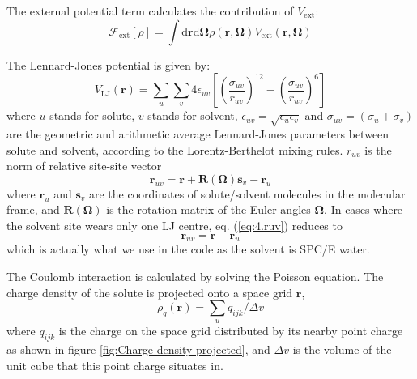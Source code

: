 The external potential term calculates the contribution of $V_{\mathrm{ext}}$:
\begin{equation}
\mathcal{F}_{\mathrm{ext}}[\rho]=\int\mathrm{d}\mathbf{r}\mathrm{d}\mathbf{\mathbf{\Omega}}\rho(\mathbf{r},\mathbf{\mathbf{\mathbf{\mathbf{\Omega}}}})V_{\mathrm{ext}}(\mathbf{r},\mathbf{\mathbf{\mathbf{\mathbf{\Omega}}}})
\end{equation}

The Lennard-Jones potential is given by:
\begin{equation}
V_{\mathrm{LJ}}(\mathbf{r})=\sum_{u}\sum_{v}4\epsilon_{uv}\left[\left(\dfrac{\sigma_{uv}}{r_{uv}}\right)^{12}-\left(\dfrac{\sigma_{uv}}{r_{uv}}\right)^{6}\right]\label{eq:4.LJ}
\end{equation}
where $u$ stands for solute, $v$ stands for solvent, $\epsilon_{uv}=\sqrt{\epsilon_{u}\epsilon_{v}}$
and $\sigma_{uv}=\left(\sigma_{u}+\sigma_{v}\right)$ are the geometric
and arithmetic average Lennard-Jones parameters between solute and
solvent, according to the Lorentz-Berthelot mixing rules. $r_{uv}$
is the norm of relative site-site vector
\begin{equation}
\mathbf{r}_{uv}=\mathbf{r}+\mathbf{R}(\mathbf{\Omega})\mathbf{s}_{v}-\mathbf{r}_{u}\label{eq:4.ruv}
\end{equation}
where $\mathbf{r}_{u}$ and $\mathbf{s}_{v}$ are the coordinates
of solute/solvent molecules in the molecular frame, and $\mathbf{R}(\mathbf{\Omega})$
is the rotation matrix of the Euler angles $\mathbf{\Omega}$. In
cases where the solvent site wears only one LJ centre, eq. (\ref{eq:4.ruv})
reduces to
\begin{equation}
\mathbf{r}_{uv}=\mathbf{r}-\mathbf{r}_{u}
\end{equation}
which is actually what we use in the code as the solvent is SPC/E
water.

The Coulomb interaction is calculated by solving the Poisson equation.
The charge density of the solute is projected onto a space grid $\mathbf{r}$,
\begin{equation}
\rho_{q}(\mathbf{r})=\sum_{u}q_{ijk}/\Delta v
\end{equation}
where $q_{ijk}$ is the charge on the space grid distributed by its
nearby point charge as shown in figure \ref{fig:Charge-density-projected},
and $\Delta v$ is the volume of the unit cube that this point charge
situates in.

